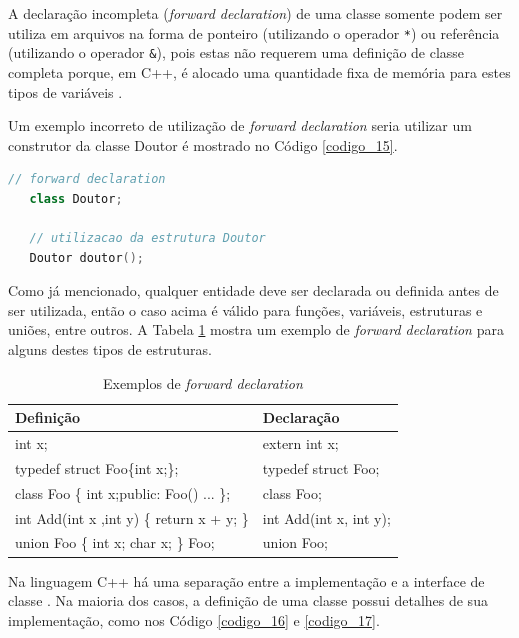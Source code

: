 A declaração incompleta (\textit{forward declaration}) de uma classe somente podem
 ser utiliza em arquivos na forma de ponteiro (utilizando o operador \texttt{*})
 ou referência (utilizando o operador \texttt{\&}), pois estas não requerem uma
 definição de classe completa porque, em C++, é alocado uma quantidade fixa
 de memória para estes tipos de variáveis \cite[pág. 111]{ref43}.

Um exemplo incorreto de utilização de \textit{forward declaration} seria utilizar
 um construtor da classe Doutor é mostrado no Código \ref{codigo_15}.


\begin{lstlisting}[language=C++,caption={
                          Uso incorreto de \textit{forward declaration}},
                                                label=codigo_15]
   // forward declaration
   class Doutor;

   // utilizacao da estrutura Doutor
   Doutor doutor();

\end{lstlisting}

Como já mencionado, qualquer entidade deve ser declarada ou definida antes
 de ser utilizada, então o caso acima é válido para funções, variáveis,
 estruturas e uniões, entre outros. A Tabela \ref{tab:tabela_03} mostra
 um exemplo de \textit{forward declaration} para alguns destes tipos
 de estruturas.

\begin{table}[!ht]
    \centering
    \caption{Exemplos de \textit{forward declaration}}
    \label{tab:tabela_03}
    \begin{tabular}{>{\ttfamily}l>{\ttfamily}l}
    \toprule
    \textbf{Definição} & \textbf{Declaração} \\
    \midrule
    int x; & extern int x;\\
    \rowcolor[gray]{0.9}
    typedef struct Foo\{int x;\}; & typedef struct Foo;\\
    class Foo \{ int x;public: Foo() ... \}; & class Foo;\\
    \rowcolor[gray]{0.9}
    int Add(int x ,int  y) \{ return x + y; \} & int Add(int x, int y);\\
    union Foo \{ int x; char x; \} Foo; & union Foo;\\
    \bottomrule
    \end{tabular}
\end{table}


Na linguagem C++ há uma separação entre  a implementação e a interface de
 classe \cite[pág. 140]{ref44}. Na maioria dos casos, a definição de uma classe possui
 detalhes de sua implementação, como nos Código \ref{codigo_16} e \ref{codigo_17}.


